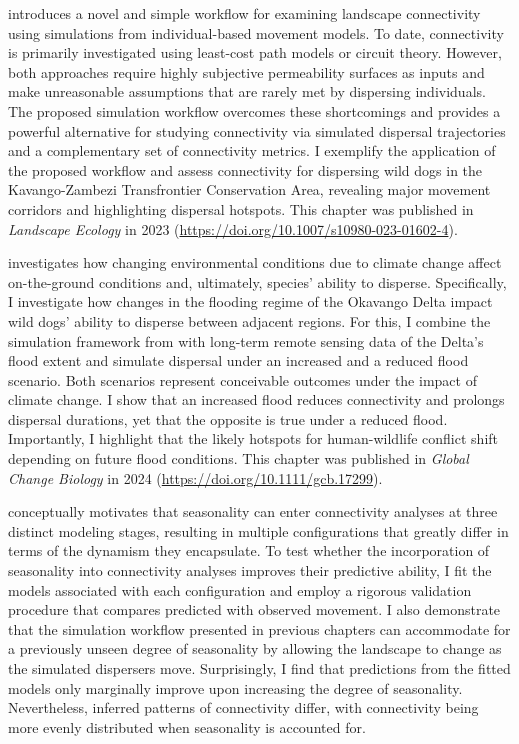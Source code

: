 \documentclass[abstract=on,twoside,10pt,a4paper,bibliography=totocnumbered]{report}
\begin{document}
 introduces a novel and simple workflow for examining
landscape connectivity using simulations from individual-based movement models.
To date, connectivity is primarily investigated using least-cost path models or
circuit theory. However, both approaches require highly subjective permeability
surfaces as inputs and make unreasonable assumptions that are rarely met by
dispersing individuals. The proposed simulation workflow overcomes these
shortcomings and provides a powerful alternative for studying connectivity via
simulated dispersal trajectories and a complementary set of connectivity
metrics. I exemplify the application of the proposed workflow and assess
connectivity for dispersing wild dogs in the Kavango-Zambezi Transfrontier
Conservation Area, revealing major movement corridors and highlighting dispersal
hotspots. This chapter was published in \textit{Landscape Ecology} in 2023
(\url{https://doi.org/10.1007/s10980-023-01602-4}).

 investigates how changing environmental conditions due to
climate change affect on-the-ground conditions and, ultimately, species'
ability to disperse. Specifically, I investigate how changes in the flooding
regime of the Okavango Delta impact wild dogs' ability to disperse between
adjacent regions. For this, I combine the simulation framework from
 with long-term remote sensing data of the Delta's flood
extent and simulate dispersal under an increased and a reduced flood scenario.
Both scenarios represent conceivable outcomes under the impact of climate
change. I show that an increased flood reduces connectivity and prolongs
dispersal durations, yet that the opposite is true under a reduced flood.
Importantly, I highlight that the likely hotspots for human-wildlife conflict
shift depending on future flood conditions. This chapter was published in
\textit{Global Change Biology} in 2024
(\url{https://doi.org/10.1111/gcb.17299}).

 conceptually motivates that seasonality can enter
connectivity analyses at three distinct modeling stages, resulting in multiple
configurations that greatly differ in terms of the dynamism they encapsulate. To
test whether the incorporation of seasonality into connectivity analyses
improves their predictive ability, I fit the models associated with each
configuration and employ a rigorous validation procedure that compares predicted
with observed movement. I also demonstrate that the simulation workflow
presented in previous chapters can accommodate for a previously unseen degree of
seasonality by allowing the landscape to change as the simulated dispersers
move. Surprisingly, I find that predictions from the fitted models only
marginally improve upon increasing the degree of seasonality. Nevertheless,
inferred patterns of connectivity differ, with connectivity being more evenly
distributed when seasonality is accounted for.
\end{document}

